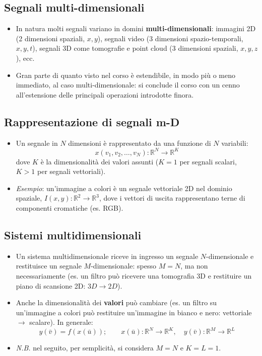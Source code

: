 \documentclass[12pt, a4paper]{article}
\begin{document}
\subsection{Segnali multi-dimensionali}
\begin{itemize}
    \item In natura molti segnali variano in domini \textbf{multi-dimensionali}: immagini 2D (2 dimensioni spaziali, $x,y$), segnali video (3 dimensioni spazio-temporali, $x,y,t$), segnali 3D come tomografie e point cloud (3 dimensioni spaziali, $x,y,z$), ecc.
    \item Gran parte di quanto visto nel corso è estendibile, in modo più o meno immediato, al caso multi-dimensionale: si conclude il corso con un cenno all'estensione delle principali operazioni introdotte finora.
\end{itemize}

\subsection{Rappresentazione di segnali m-D}
\begin{itemize}
    \item Un segnale in $N$ dimensioni è rappresentato da una funzione di $N$ variabili:
    $$x(v_1,v_2,\dots,v_N): \mathbb{R}^N \to \mathbb{R}^K$$
    dove $K$ è la dimensionalità dei valori assunti ($K=1$ per segnali scalari, $K>1$ per segnali vettoriali).
    \item \textit{Esempio}: un'immagine a colori è un segnale vettoriale 2D nel dominio spaziale, $I(x,y):\mathbb{R}^2\to\mathbb{R}^3$, dove i vettori di uscita rappresentano terne di componenti cromatiche (es. RGB).
\end{itemize}

\subsection{Sistemi multidimensionali}
\begin{itemize}
    \item Un sistema multidimensionale riceve in ingresso un segnale $N$-dimensionale e restituisce un segnale $M$-dimensionale: spesso $M=N$, ma non necessariamente (es. un filtro può ricevere una tomografia 3D e restituire un piano di scansione 2D: $3D\to2D$).
    \item Anche la dimensionalità dei \textbf{valori} può cambiare (es. un filtro su un'immagine a colori può restituire un'immagine in bianco e nero: vettoriale $\to$ scalare). In generale:
    $$y(\bar v) = f(x(\bar u)); \qquad x(\bar u):\mathbb{R}^N\to\mathbb{R}^K, \quad y(\bar v):\mathbb{R}^M\to\mathbb{R}^L$$
    \item[] \textit{N.B.} nel seguito, per semplicità, si considera $M=N$ e $K=L=1$.
\end{itemize}
\end{document}

